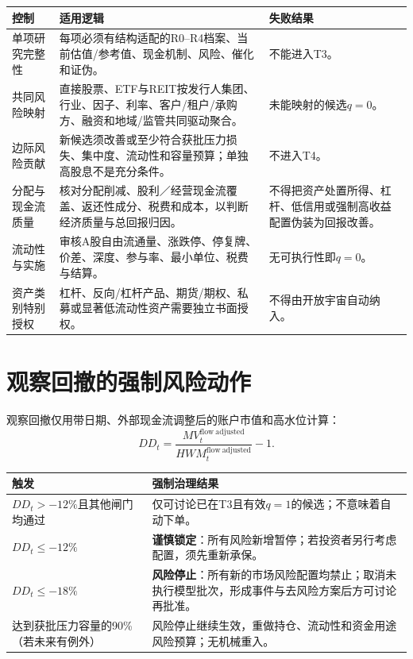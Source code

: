 \begin{exhibitbox}[所有资产格式共用的组合约束]
\small
\begin{tabularx}{\exhibitboxwidth}{L{3.15cm}P P}
\toprule
\textbf{控制} & \textbf{适用逻辑} & \textbf{失败结果} \\
\midrule
单项研究完整性 & 每项必须有结构适配的R0--R4档案、当前估值/参考值、现金机制、风险、催化和证伪。 & 不能进入T3。 \\
共同风险映射 & 直接股票、ETF与REIT按发行人集团、行业、因子、利率、客户/租户/承购方、融资和地域/监管共同驱动聚合。 & 未能映射的候选$q=0$。 \\
边际风险贡献 & 新候选须改善或至少符合获批压力损失、集中度、流动性和容量预算；单独高股息不是充分条件。 & 不进入T4。 \\
分配与现金流质量 & 核对分配削减、股利／经营现金流覆盖、返还性成分、税费和成本，以判断经济质量与总回报归因。 & 不得把资产处置所得、杠杆、低信用或强制高收益配置伪装为回报改善。 \\
流动性与实施 & 审核A股自由流通量、涨跌停、停复牌、价差、深度、参与率、最小单位、税费与结算。 & 无可执行性即$q=0$。 \\
资产类别特别授权 & 杠杆、反向/杠杆产品、期货/期权、私募或显著低流动性资产需要独立书面授权。 & 不得由开放宇宙自动纳入。 \\
\bottomrule
\end{tabularx}
\end{exhibitbox}

\section{观察回撤的强制风险动作}

观察回撤仅用带日期、外部现金流调整后的账户市值和高水位计算：
\[
DD_t=\frac{MV_t^{\mathrm{flow\ adjusted}}}{HWM_t^{\mathrm{flow\ adjusted}}}-1.
\]

\begin{exhibitbox}[风险行动线不是被动“复核”]
\small
\begin{tabularx}{\exhibitboxwidth}{L{3.2cm}P}
\toprule
\textbf{触发} & \textbf{强制治理结果} \\
\midrule
$DD_t>-12\%$且其他闸门均通过 & 仅可讨论已在T3且有效$q=1$的候选；不意味着自动下单。 \\
$DD_t\leq-12\%$ & \textbf{谨慎锁定}：所有风险新增暂停；若投资者另行考虑配置，须先重新承保。 \\
$DD_t\leq-18\%$ & \textbf{风险停止}：所有新的市场风险配置均禁止；取消未执行模型批次，形成事件与去风险方案后方可讨论再批准。 \\
达到获批压力容量的90\%（若未来有例外） & 风险停止继续生效，重做持仓、流动性和资金用途风险预算；无机械重入。 \\
\bottomrule
\end{tabularx}
\end{exhibitbox}


